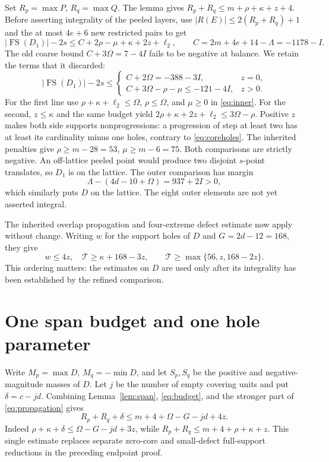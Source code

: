 \documentclass[11pt,a4paper]{article}
\newcommand{\FS}{\operatorname{FS}}
\newcommand{\T}{\mathcal T}
\begin{document}
Set $R_p=\max P$, $R_q=\max Q$. The lemma gives
$R_p+R_q\le m+\rho+\kappa+z+4$.
Before asserting integrality of the peeled layers, use
$|R(E)|\le2(R_p+R_q)+1$ and the at most $4e+6$ new restricted pairs to get
\begin{equation}\label{eq:inner}
 |\FS(D_1)|-2s
 \le C+2\rho-\mu+\kappa+2z+\ell_2,
 \qquad C=2m+4e+14-\Lambda=-1178-I.
\end{equation}
The old coarse bound $C+3\Omega=7-4I$ fails to be negative at balance.
We retain the terms that it discarded:
\[
 |\FS(D_1)|-2s\le
 \begin{cases}
 C+2\Omega=-388-3I,&z=0,\\
 C+3\Omega-\rho-\mu\le-121-4I,&z>0.
 \end{cases}
\]
For the first line use $\rho+\kappa+\ell_2\le\Omega$,
$\rho\le\Omega$, and $\mu\ge0$ in \eqref{eq:inner}.
For the second, $z\le\kappa$ and the same budget yield
$2\rho+\kappa+2z+\ell_2\le3\Omega-\rho$.
Positive $z$ makes both side supports nonprogressions: a progression of
step at least two has at least its cardinality minus one holes, contrary
to \eqref{eq:coreholes}. The inherited penalties give
$\rho\ge m-28=53$, $\mu\ge m-6=75$.
Both comparisons are strictly negative. An off-lattice peeled point would
produce two disjoint $s$-point translates, so $D_1$ is on the lattice.
The outer comparison has margin
\[
 \Lambda-(4d-10+\Omega)=937+2I>0,
\]
which similarly puts $D$ on the lattice. The eight outer elements are
not yet asserted integral.

The inherited overlap propagation and four-extreme defect estimate now
apply without change. Writing $w$ for the support holes of $D$ and
$G=2d-12=168$, they give
\begin{equation}\label{eq:propagation}
 w\le4z,\quad\T\ge\kappa+168-3z,
 \qquad\T\ge\max\{56,z,168-2z\}.
\end{equation}
This ordering matters: the estimates on $D$ are used only after its
integrality has been established by the refined comparison.

\section{One span budget and one hole parameter}
Write $M_p=\max D$, $M_q=-\min D$, and let $S_p,S_q$ be the positive
and negative-magnitude masses of $D$. Let $j$ be the number of empty
covering units and put $\delta=c-jd$. Combining Lemma~\ref{lem:span},
\eqref{eq:budget}, and the stronger part of \eqref{eq:propagation} gives
\begin{equation}\label{eq:joint}
 \boxed{R_p+R_q+\delta\le m+4+\Omega-G-jd+4z.}
\end{equation}
Indeed $\rho+\kappa+\delta\le\Omega-G-jd+3z$, while
$R_p+R_q\le m+4+\rho+\kappa+z$.
This single estimate replaces separate zero-core and small-defect
full-support reductions in the preceding endpoint proof.
\end{document}
